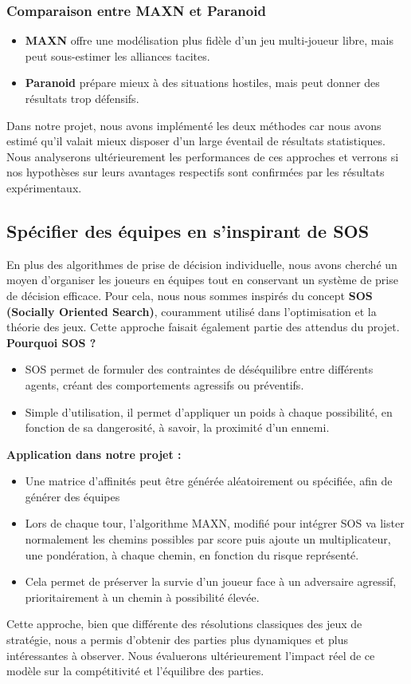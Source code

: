 \subsubsection{Comparaison entre MAXN et Paranoid}
\begin{itemize}
    \item \textbf{MAXN} offre une modélisation plus fidèle d'un jeu multi-joueur libre, mais peut sous-estimer les alliances tacites.
    \item \textbf{Paranoid} prépare mieux à des situations hostiles, mais peut donner des résultats trop défensifs.
\end{itemize}
Dans notre projet, nous avons implémenté les deux méthodes car nous avons estimé qu'il valait mieux disposer d'un large éventail de résultats statistiques. Nous analyserons ultérieurement les performances de ces approches et verrons si nos hypothèses sur leurs avantages respectifs sont confirmées par les résultats expérimentaux.

\subsection{Spécifier des équipes en s'inspirant de SOS}
En plus des algorithmes de prise de décision individuelle, nous avons cherché un moyen d'organiser les joueurs en équipes tout en conservant un système de prise de décision efficace. Pour cela, nous nous sommes inspirés du concept \textbf{SOS (Socially Oriented Search)}, couramment utilisé dans l'optimisation et la théorie des jeux. Cette approche faisait également partie des attendus du projet.
\textbf{Pourquoi SOS ?}
\begin{itemize}
    \item SOS permet de formuler des contraintes de déséquilibre entre différents agents, créant des comportements agressifs ou préventifs.
    \item Simple d’utilisation, il permet d’appliquer un poids à chaque possibilité, en fonction de sa dangerosité, à savoir, la proximité d’un ennemi.
\end{itemize}

\newpage

\textbf{Application dans notre projet :}
\begin{itemize}
    \item Une matrice d’affinités peut être générée aléatoirement ou spécifiée, afin de générer des équipes
    \item Lors de chaque tour, l’algorithme MAXN, modifié pour intégrer SOS va lister normalement les chemins possibles par score puis ajoute un multiplicateur, une pondération, à chaque chemin, en fonction du risque représenté.
    \item Cela permet de préserver la survie d’un joueur face à un adversaire agressif, prioritairement à un chemin à possibilité élevée.
\end{itemize}
Cette approche, bien que différente des résolutions classiques des jeux de stratégie, nous a permis d'obtenir des parties plus dynamiques et plus intéressantes à observer. Nous évaluerons ultérieurement l'impact réel de ce modèle sur la compétitivité et l'équilibre des parties.

